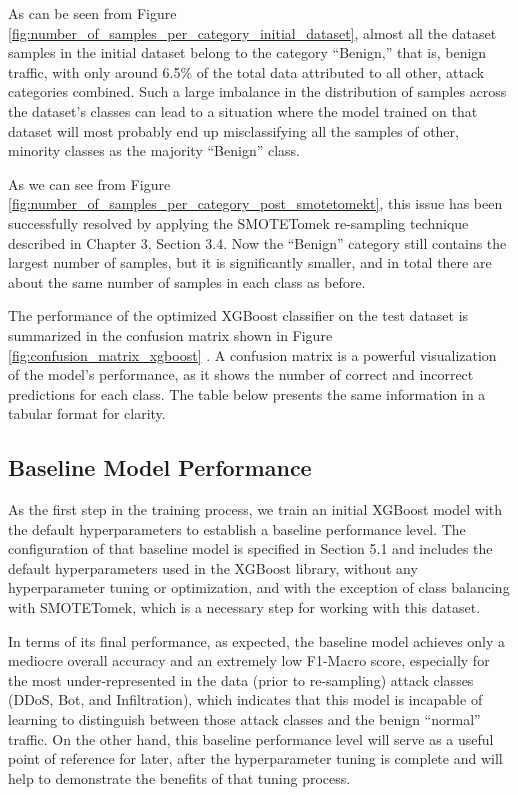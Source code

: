 As can be seen from Figure \ref{fig:number_of_samples_per_category_initial_dataset}, almost all the dataset samples in the initial dataset belong to the category “Benign,” that is, benign traffic, with only around 6.5\% of the total data attributed to all other, attack categories combined. Such a large imbalance in the distribution of samples across the dataset’s classes can lead to a situation where the model trained on that dataset will most probably end up misclassifying all the samples of other, minority classes as the majority “Benign” class.

As we can see from Figure \ref{fig:number_of_samples_per_category_post_smotetomekt}, this issue has been successfully resolved by applying the SMOTETomek re-sampling technique described in Chapter 3, Section 3.4. Now the “Benign” category still contains the largest number of samples, but it is significantly smaller, and in total there are about the same number of samples in each class as before.

The performance of the optimized XGBoost classifier on the test dataset is summarized in the confusion matrix shown in Figure \ref{fig:confusion_matrix_xgboost} . A confusion matrix is a powerful visualization of the model's performance, as it shows the number of correct and incorrect predictions for each class. The table below presents the same information in a tabular format for clarity.


\subsection{Baseline Model Performance}

As the first step in the training process, we train an initial XGBoost model with the default hyperparameters to establish a baseline performance level. The configuration of that baseline model is specified in Section 5.1 and includes the default hyperparameters used in the XGBoost library, without any hyperparameter tuning or optimization, and with the exception of class balancing with SMOTETomek, which is a necessary step for working with this dataset.

In terms of its final performance, as expected, the baseline model achieves only a mediocre overall accuracy and an extremely low F1-Macro score, especially for the most under-represented in the data (prior to re-sampling) attack classes (DDoS, Bot, and Infiltration), which indicates that this model is incapable of learning to distinguish between those attack classes and the benign “normal” traffic. On the other hand, this baseline performance level will serve as a useful point of reference for later, after the hyperparameter tuning is complete and will help to demonstrate the benefits of that tuning process.


